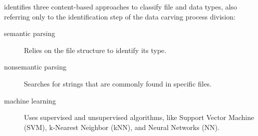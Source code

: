 \cite{beebe_sceadan:_2013} identifies three content-based approaches to classify file and data types, also referring only to the identification step of the \cite{ali_review_2018} data carving process division:
\begin{description}
    \item [semantic parsing] Relies on the file structure to identify its type.
    \item[nonsemantic parsing] Searches for strings that are commonly found in specific files.
    \item [machine learning] Uses supervised and unsupervised algorithms, like Support Vector Machine (SVM), k-Nearest Neighbor (kNN), and Neural Networks (NN).
\end{description}

